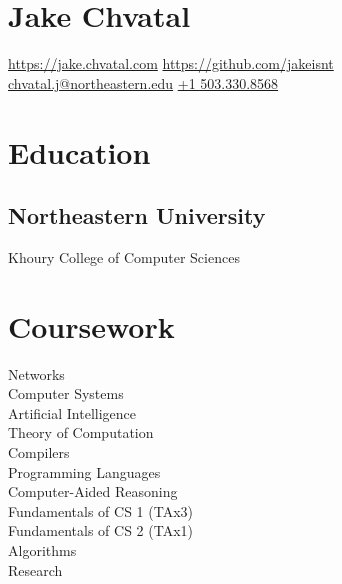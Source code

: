 \documentclass[letterpaper]{cv} %
\begin{document}
\lastupdated

\begin{minipage}[t]{0.33\textwidth} %

  \section{Jake Chvatal} %
  \url{https://jake.chvatal.com} 
  \url{https://github.com/jakeisnt} \\ %
  \href{mailto:chvatal.j@northeastern.edu}{chvatal.j@northeastern.edu} 
  \href{sms://15033308568}{+1 503.330.8568}

  \section{Education}
  \subsection{Northeastern University}
  Khoury College of Computer Sciences \\
  \sectionspace %

  \section{Coursework}
  Networks \\
  Computer Systems \\
  Artificial Intelligence \\
  Theory of Computation \\
  Compilers \\
  Programming Languages \\
  Computer-Aided Reasoning \\
  Fundamentals of CS 1 (TAx3) \\
  Fundamentals of CS 2 (TAx1) \\
  Algorithms \\
  Research


\end{minipage}
\end{document}
